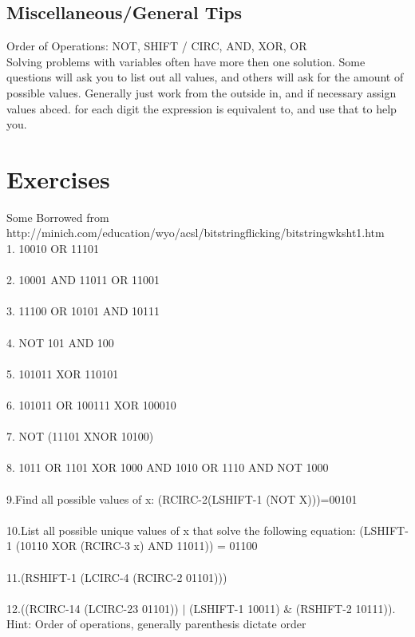 \documentclass{article}
\begin{document}
\subsection{Miscellaneous/General Tips}
Order of Operations: NOT, SHIFT / CIRC, AND, XOR, OR
\\
Solving problems with variables often have more then one solution. Some questions will ask you to list out all values, and others will ask for the amount of possible values. Generally just work from the outside in, and if necessary assign values abced. for each digit the expression is equivalent to, and use that to help you.
\section{Exercises}
Some Borrowed from http://minich.com/education/wyo/acsl/bitstringflicking/bitstringwksht1.htm
\\
 1. 10010 OR 11101
\\
\\
 2. 10001 AND 11011 OR 11001
\\
\\
3. 11100 OR 10101 AND 10111
\\
\\
 4. NOT 101 AND 100
\\
\\
 5. 101011 XOR 110101
\\
\\
 6. 101011 OR 100111 XOR 100010
\\
\\
 7. NOT (11101 XNOR 10100)
\\
\\
8. 1011 OR 1101 XOR 1000 AND 1010 OR 1110 AND NOT 1000
\\
\\
9.Find all possible values of x: (RCIRC-2(LSHIFT-1 (NOT X)))=00101
\\
\\
10.List all possible unique values of x that solve the following equation: (LSHIFT-1 (10110 XOR (RCIRC-3 x) AND 11011)) = 01100
\\
\\
11.(RSHIFT-1 (LCIRC-4 (RCIRC-2 01101)))
\\
\\
12.((RCIRC-14 (LCIRC-23 01101)) $\mid$ (LSHIFT-1 10011) $\&$ (RSHIFT-2 10111)). Hint: Order of operations, generally parenthesis dictate order
\enddocument
\end{document}
